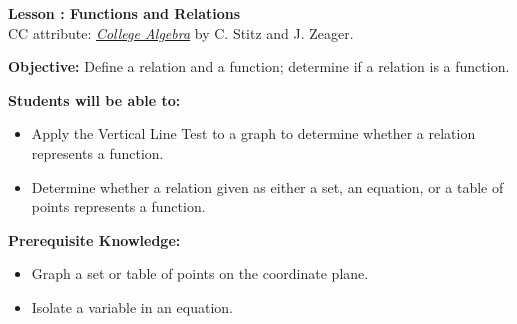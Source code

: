 \documentclass[12pt]{article}
\theoremstyle{definition}
\begin{document}
{\bf \large Lesson : Functions and Relations}
\\ CC attribute: \href{http://www.stitz-zeager.com}{\it{College Algebra}} by C. Stitz and J. Zeager. 
\hfill \doclicenseImage[imagewidth=5em]\\
\par
{\bf Objective:} Define a relation and a function; determine if a relation is a function.\\
\par
{\bf Students will be able to:}
\begin{itemize}
	\item Apply the Vertical Line Test to a graph to determine whether a relation represents a function.
	\item Determine whether a relation given as either a set, an equation, or a table of points represents a function.
\end{itemize}
{\bf Prerequisite Knowledge:}
\begin{itemize}
	\item Graph a set or table of points on the coordinate plane.
	\item Isolate a variable in an equation.
\end{itemize}
\hrulefill
\end{document}
